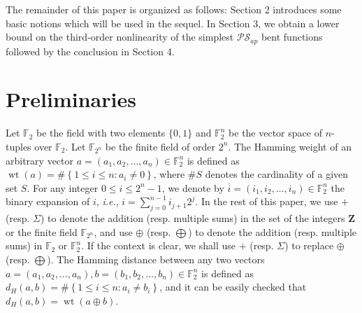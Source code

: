 \documentclass[preprint,10pt]{elsarticle}
\newcommand{\Z}{\mathbf{Z}}
\newcommand{\F}{\mathbb{F}}
\newcommand{\0}{\textbf{0}}
\newcommand{\1}{\textbf{1}}
\newcommand{\wt}{\operatorname{wt}}
\theoremstyle{plain}
\begin{document}
    The remainder of this paper is organized as follows:
    Section 2 introduces some basic notions which will be used in the sequel.
    In Section 3, we  obtain a lower bound on the third-order nonlinearity of the simplest $\mathcal{PS}_{ap}$ bent functions followed by the conclusion in Section 4.

\section{Preliminaries}
    Let $\F_2$ be the field with two elements $\{0,1\}$ and $\F_2^n$ be the vector space of $n$-tuples over $\F_2$.
    Let $\F_{2^n}$ be the finite field of order $2^n$.
    The Hamming weight of an arbitrary vector $a=(a_1,a_2,\dots,a_n)\in\F_2^n$ is defined as $\wt(a)=\#\left\{ 1\le i\le n:a_i\ne 0 \right\}$, where $\#S$ denotes the cardinality of a given set $S$.
    For any integer $0\le i \le 2^n-1$, we denote by $\overline{i}=(i_1,i_2,\dots,i_n)\in\F_2^n$ the binary expansion of $i$, \emph{i.e.}, $i=\sum_{j=0}^{n-1}i_{j+1}2^j$.
    In the rest of this paper, we use $+$ (resp. $\Sigma$) to denote the addition (resp. multiple sums) in the set of the integers $\Z$ or the finite field $\F_{2^n}$, and use $\oplus$ (resp. $\bigoplus$) to denote the addition (resp. multiple sums) in $\F_2$ or $\F_2^n$.
    If the context is clear, we shall use $+$ (resp. $\Sigma$) to replace $\oplus$ (resp. $\bigoplus$).
    The Hamming distance between any two vectors $a=(a_1,a_2,\dots,a_n),b=(b_1,b_2,\dots,b_n)\in\F_2^n$ is defined as $d_H(a,b)=\#\left\{ 1\le i\le n : a_i\ne b_i \right\}$, and it can be easily checked that $d_H(a,b)=\wt(a\oplus b)$.
\end{document}
